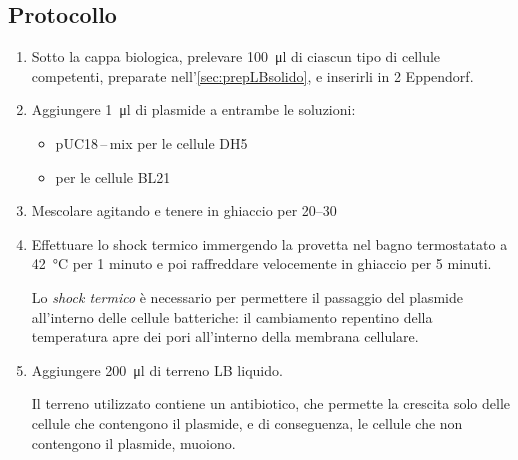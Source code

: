 \subsection{Protocollo}
\begin{enumerate}
	\item Sotto la cappa biologica, prelevare \qty{100}{\micro\litre} di ciascun tipo di cellule competenti, preparate nell'\autoref{sec:prepLBsolido}, e inserirli in 2 \foreignlanguage{german}{Eppendorf}.
	\item Aggiungere \qty{1}{\micro\litre} di plasmide a entrambe le soluzioni:
	      \begin{itemize}[person]
		      \item pUC18\,--\,mix per le cellule DH5\textalpha
		      \item {} per le cellule BL21
	      \end{itemize}
	\item Mescolare agitando e tenere in ghiaccio per \qtyrange{20}{30}{\min}
	\item Effettuare lo shock termico immergendo la provetta nel bagno termostatato a \qty{42}{\celsius} per 1 minuto e poi raffreddare velocemente in ghiaccio per 5 minuti.
	      \begin{myBox}
		      Lo \textit{shock termico} è necessario per permettere il passaggio del plasmide all’interno delle cellule batteriche: il cambiamento repentino della temperatura apre dei pori all’interno della membrana cellulare.
	      \end{myBox}
	\item Aggiungere \qty{200}{\micro\litre} di terreno LB liquido.
	      \begin{Note}
		      Il terreno utilizzato contiene un antibiotico, che permette la crescita solo delle cellule che contengono il plasmide, e di conseguenza, le cellule che non contengono il plasmide, muoiono.


\end{Note}
\end{enumerate}
